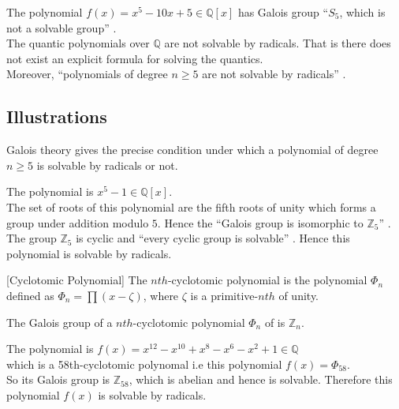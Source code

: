The polynomial \(f(x)=x^5-10x+5 \in \mathbb{Q}[x]\) has Galois group ``\(S_5\), which is not a solvable group'' \cite{hunger}. \\[3mm]
The quantic polynomials over \(\mathbb{Q}\) are not solvable by radicals. That is there does not exist an explicit formula for solving the quantics. \\
Moreover, ``polynomials of degree \(n \geq 5\) are not solvable by radicals'' \cite{hunger}.

\subsection{Illustrations}
Galois theory gives the precise condition under which a polynomial of degree \(n \geq 5\) is solvable by radicals or not.

\vspace{5mm}
\begin{example}
  The polynomial is \(x^5-1 \in \mathbb{Q}[x]\).\\
  The set of  roots of this polynomial are the fifth roots of unity which forms a group under addition modulo \(5\). Hence the ``Galois group is isomorphic to \(\mathbb{Z}_5\)'' \cite{hunger}. The group \(\mathbb{Z}_5\) is cyclic and ``every cyclic group is solvable'' \cite{galois}. Hence this polynomial is solvable by radicals.
\end{example}

\vspace{3mm}
\begin{definition} \cite{galois} [Cyclotomic Polynomial]
  The \(nth\)-cyclotomic polynomial is the polynomial \({\Phi}_n\) defined as \({\Phi}_n= \prod {(x-\zeta)}\), where \(\zeta\) is a primitive-\(nth\) of unity.
\end{definition}

\vspace{3mm}
\begin{theorem} \cite{galois}
  The Galois group of a \(nth\)-cyclotomic polynomial \({\Phi}_n\) of is \(\mathbb{Z}_n\).
\end{theorem}

\vspace{3mm}
\begin{example}
The polynomial is \(f(x)=x^{12}-x^{10}+x^8-x^6-x^2+1 \in \mathbb{Q}\)\\
which is a 58th-cyclotomic polynomal i.e this polynomial \(f(x)={\Phi}_{58}\).\\
  So its Galois group is \(\mathbb{Z}_{58}\), which is abelian and hence is solvable. Therefore this polynomial \(f(x)\) is solvable by radicals.
\end{example}
